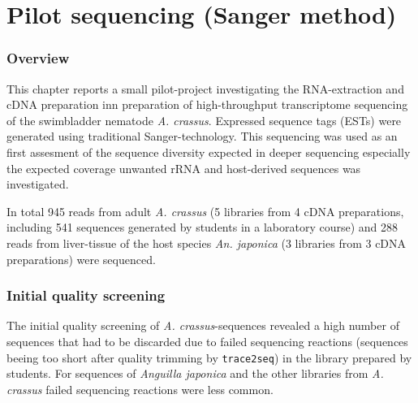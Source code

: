 
\chapter{Pilot sequencing (Sanger method)} %
\label{pilot-seq}


\ifpdf
    \graphicspath{{3_pilot/figures/PNG/}{3_pilot/figures/PDF/}{3_pilot/figures/}}
\else
    \graphicspath{{3_pilot/figures/EPS/}{3_pilot/figures/}}
\fi


\subsection{Overview}

This chapter reports a small pilot-project investigating the
RNA-extraction and cDNA preparation inn preparation of high-throughput
transcriptome sequencing of the swimbladder nematode
\textit{A. crassus}. Expressed sequence tags (ESTs) were generated
using traditional Sanger-technology. This sequencing was used as an
first assesment of the sequence diversity expected in deeper
sequencing especially the expected coverage unwanted rRNA and
host-derived sequences was investigated.

In total 945 reads from adult \textit{A. crassus} (5 libraries from 4
cDNA preparations, including 541 sequences generated by students in a
laboratory course) and 288 reads from liver-tissue of the host species
\textit{An. japonica} (3 libraries from 3 cDNA preparations) were
sequenced.

\subsection{Initial quality screening}
\label{qual-pil}

The initial quality screening of \textit{A. crassus}-sequences
revealed a high number of sequences that had to be discarded due to
failed sequencing reactions (sequences beeing too short after quality
trimming by \texttt{trace2seq}) in the library prepared by
students. For sequences of \textit{Anguilla japonica} and the other
libraries from \textit{A. crassus} failed sequencing reactions were
less common.


